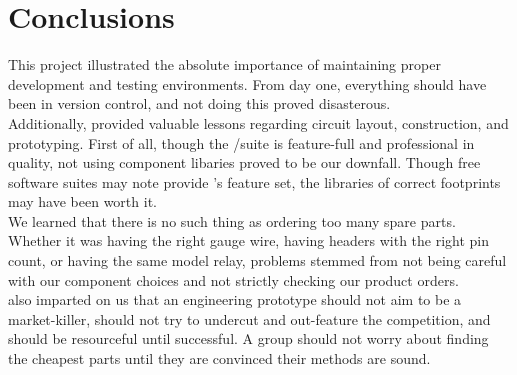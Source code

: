 \section{Conclusions}
This project illustrated the absolute importance of maintaining proper development and testing environments.  From day one, everything should have been in version control, and not doing this proved disasterous.\\

Additionally, \netlets provided valuable lessons regarding circuit layout, construction, and prototyping.  First of all, though the \dxd/\pads suite is feature-full and professional in quality, not using component libaries proved to be our downfall.  Though free software suites may note provide \dxd 's feature set, the libraries of correct footprints may have been worth it.\\

We learned that there is no such thing as ordering too many spare parts.  Whether it was having the right gauge wire, having headers with the right pin count, or having the same model relay, problems stemmed from not being careful with our component choices and not strictly checking our product orders.\\

\netlets also imparted on us that an engineering prototype should not aim to be a market-killer, should not try to undercut and out-feature the competition, and should be resourceful until successful.  A group should not worry about finding the cheapest parts until they are convinced their methods are sound.\\
